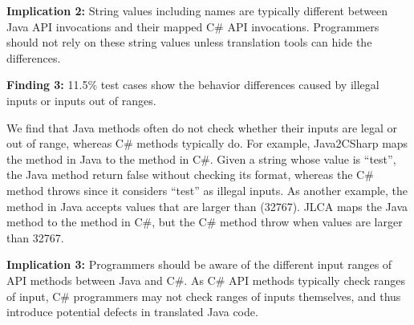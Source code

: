 \textbf{Implication 2:} String values including names are typically different between Java API invocations and their mapped C\# API invocations. Programmers should not rely on these string values unless translation tools can hide the differences.

\textbf{Finding 3:} 11.5\% test cases show the behavior differences caused by illegal inputs or inputs out of ranges.

We find that Java methods often do not check whether their inputs are legal or out of range, whereas C\# methods typically do. For example, Java2CSharp maps the  method in Java to the  method in C\#. Given a string whose value is ``test'', the Java method return false without checking its format, whereas the C\# method throws  since it considers ``test'' as illegal inputs. As another example, the  method in Java accepts values that are larger than  (32767). JLCA maps the Java method to the  method in C\#, but the C\# method throw  when values are larger than 32767.

\textbf{Implication 3:} Programmers should be aware of the different input ranges of API methods between Java and C\#. As C\# API methods typically check ranges of input, C\# programmers may not check ranges of inputs themselves, and thus introduce potential defects in translated Java code.

